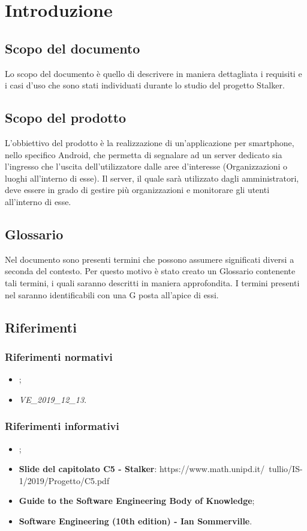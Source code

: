 \section{Introduzione}
\subsection{Scopo del documento}
Lo scopo del documento è quello di descrivere in maniera dettagliata i requisiti e i casi d'uso che sono stati individuati durante lo studio del progetto Stalker.
\subsection{Scopo del prodotto}
L'obbiettivo del prodotto è la realizzazione di un'applicazione per smartphone, nello specifico Android, che permetta di segnalare ad un server dedicato sia l'ingresso che l'uscita dell'utilizzatore dalle aree d'interesse (Organizzazioni o luoghi all'interno di esse).
Il server, il quale sarà utilizzato dagli amministratori, deve essere in grado di gestire più organizzazioni e monitorare gli utenti all'interno di esse.
\subsection{Glossario}
Nel documento sono presenti termini che possono assumere significati diversi a seconda del contesto. Per questo motivo è stato creato un Glossario contenente tali termini, i quali saranno descritti in maniera approfondita. I termini presenti nel  saranno identificabili con una G posta all'apice di essi.

\subsection{Riferimenti}


\subsubsection{Riferimenti normativi}
\begin{itemize}
\item {};
\item \textit{VE\_2019\_12\_13}.
\end{itemize}

\subsubsection{Riferimenti informativi}
\begin{itemize}
\item {};
\item \textbf{Slide del capitolato C5 - Stalker}: https://www.math.unipd.it/~tullio/IS-1/2019/Progetto/C5.pdf
\item \textbf{Guide to the Software Engineering Body of Knowledge};
\item \textbf{Software Engineering (10th edition) - Ian Sommerville}.
\end{itemize}

